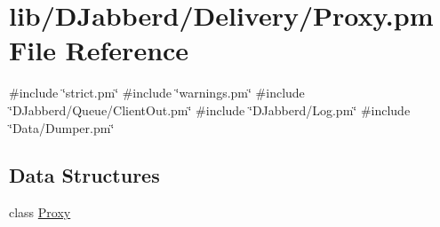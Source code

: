 \hypertarget{_delivery_2_proxy_8pm}{
\section{lib/\-D\-Jabberd/\-Delivery/\-Proxy.pm \-File \-Reference}
\label{_delivery_2_proxy_8pm}
}
{\ttfamily \#include \char`\"{}strict.\-pm\char`\"{}}\*
{\ttfamily \#include \char`\"{}warnings.\-pm\char`\"{}}\*
{\ttfamily \#include \char`\"{}\-D\-Jabberd/\-Queue/\-Client\-Out.\-pm\char`\"{}}\*
{\ttfamily \#include \char`\"{}\-D\-Jabberd/\-Log.\-pm\char`\"{}}\*
{\ttfamily \#include \char`\"{}\-Data/\-Dumper.\-pm\char`\"{}}\*
\subsection*{\-Data \-Structures}
\begin{DoxyCompactItemize}
\item 
class \hyperlink{class_d_jabberd_1_1_delivery_1_1_proxy}{\-Proxy}
\end{DoxyCompactItemize}

